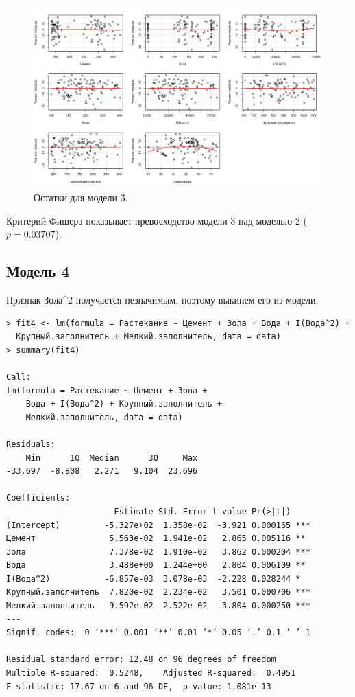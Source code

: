 \documentclass[10pt]{article}
\begin{document}
\begin{figure}[h]
  \centering
  \includegraphics[scale=0.4]{resplots_3.png}
  \caption{Остатки для модели 3.}
\end{figure}

Критерий Фишера показывает превосходство модели 3 над моделью 2 ($p = 0.03707$).

\subsection{Модель 4}

Признак Зола\textasciicircum2 получается незначимым, поэтому выкинем его из модели.

\begin{verbatim}
> fit4 <- lm(formula = Растекание ~ Цемент + Зола + Вода + I(Вода^2) +
  Крупный.заполнитель + Мелкий.заполнитель, data = data)
> summary(fit4)

Call:
lm(formula = Растекание ~ Цемент + Зола + 
    Вода + I(Вода^2) + Крупный.заполнитель + 
    Мелкий.заполнитель, data = data)

Residuals:
    Min      1Q  Median      3Q     Max 
-33.697  -8.808   2.271   9.104  23.696 

Coefficients:
                      Estimate Std. Error t value Pr(>|t|)    
(Intercept)         -5.327e+02  1.358e+02  -3.921 0.000165 ***
Цемент               5.563e-02  1.941e-02   2.865 0.005116 ** 
Зола                 7.378e-02  1.910e-02   3.862 0.000204 ***
Вода                 3.488e+00  1.244e+00   2.804 0.006109 ** 
I(Вода^2)           -6.857e-03  3.078e-03  -2.228 0.028244 *  
Крупный.заполнитель  7.820e-02  2.234e-02   3.501 0.000706 ***
Мелкий.заполнитель   9.592e-02  2.522e-02   3.804 0.000250 ***
---
Signif. codes:  0 ‘***’ 0.001 ‘**’ 0.01 ‘*’ 0.05 ‘.’ 0.1 ‘ ’ 1

Residual standard error: 12.48 on 96 degrees of freedom
Multiple R-squared:  0.5248,	Adjusted R-squared:  0.4951 
F-statistic: 17.67 on 6 and 96 DF,  p-value: 1.081e-13
\end{verbatim}
\end{document}
